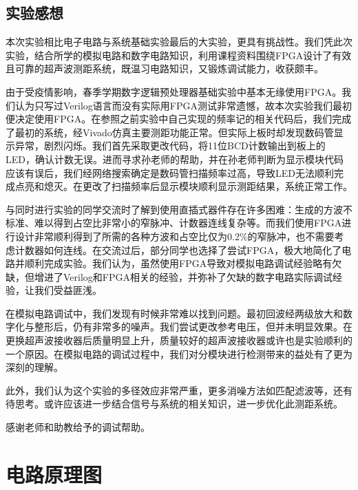 \documentclass[a4paper, twocolumn]{ctexart}
\begin{document}
\subsection{实验感想}

本次实验相比电子电路与系统基础实验最后的大实验，更具有挑战性。我们凭此次实验，结合所学的模拟电路和数字电路知识，利用课程资料围绕FPGA设计了有效且可靠的超声波测距系统，既温习电路知识，又锻炼调试能力，收获颇丰。

由于受疫情影响，春季学期数字逻辑预处理器基础实验中基本无缘使用FPGA。我们认为只写过Verilog语言而没有实际用FPGA测试非常遗憾，故本次实验我们最初便决定使用FPGA。在参照之前实验中自己实现的频率记的相关代码后，我们完成了最初的系统，经Vivado仿真主要测距功能正常。但实际上板时却发现数码管显示异常，剧烈闪烁。我们首先采取更改代码，将11位BCD计数输出到板上的LED，确认计数无误。进而寻求孙老师的帮助，并在孙老师判断为显示模块代码应该有误后，我们经网络搜索确定是数码管扫描频率过高，导致LED无法顺利完成点亮和熄灭。在更改了扫描频率后显示模块顺利显示测距结果，系统正常工作。

与同时进行实验的同学交流时了解到使用直插式器件存在许多困难：生成的方波不标准、难以得到占空比非常小的窄脉冲、计数器连线复杂等。而我们使用FPGA进行设计非常顺利得到了所需的各种方波和占空比仅为0.2\%的窄脉冲，也不需要考虑计数器如何连线。在交流过后，部分同学也选择了尝试FPGA，极大地简化了电路并顺利完成实验。我们认为，虽然使用FPGA导致对模拟电路调试经验略有欠缺，但增进了Verilog和FPGA相关的经验，并弥补了欠缺的数字电路实际调试经验，让我们受益匪浅。

在模拟电路调试中，我们发现有时候非常难以找到问题。最初回波经两级放大和数字化与整形后，仍有非常多的噪声。我们尝试更改参考电压，但并未明显效果。在更换超声波接收器后质量明显上升，质量较好的超声波接收器或许也是实验顺利的一个原因。在模拟电路的调试过程中，我们对分模块进行检测带来的益处有了更为深刻的理解。

此外，我们认为这个实验的多径效应非常严重，更多消噪方法如匹配滤波等，还有待思考。或许应该进一步结合信号与系统的相关知识，进一步优化此测距系统。

感谢老师和助教给予的调试帮助。

\nocite{ppt}
\nocite{userguide}
\nocite{ego1userguide}

\small{
    
    
}

\newpage

\appendix

\section{电路原理图}
\end{document}
